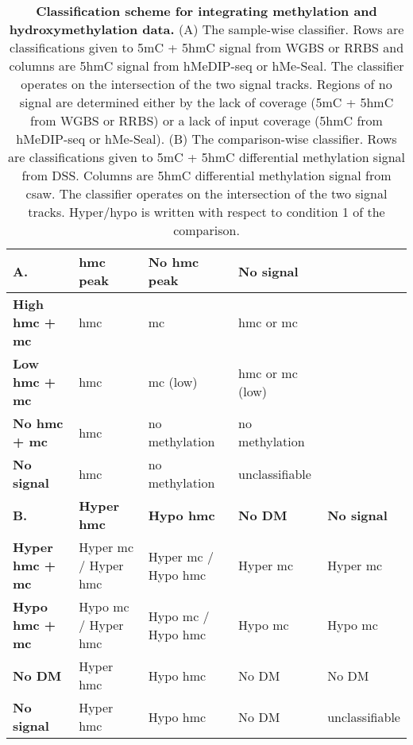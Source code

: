 \begin{sidewaystable}[!ht]
\small
\centering
\begin{tabular}{l|llll}
\textbf{A.}             & \textbf{hmc peak}    & \textbf{No hmc peak} & \textbf{No signal} &                    \\\hline
\textbf{High hmc + mc}  & hmc                  & mc                   & hmc or mc          &                    \\
\textbf{Low hmc + mc}   & hmc                  & mc (low)             & hmc or mc (low)    &                    \\
\textbf{No hmc + mc}    & hmc                  & no methylation       & no methylation     &                    \\
\textbf{No signal}      & hmc                  & no methylation       & unclassifiable     &                    \\\hline
\textbf{B.}             & \textbf{Hyper hmc}   & \textbf{Hypo hmc}    & \textbf{No DM}     & \textbf{No signal} \\\hline
\textbf{Hyper hmc + mc} & Hyper mc / Hyper hmc & Hyper mc / Hypo hmc  & Hyper mc           & Hyper mc           \\
\textbf{Hypo hmc + mc}  & Hypo mc / Hyper hmc  & Hypo mc / Hypo hmc   & Hypo mc            & Hypo mc            \\
\textbf{No DM}          & Hyper hmc            & Hypo hmc             & No DM              & No DM              \\
\textbf{No signal}      & Hyper hmc            & Hypo hmc             & No DM              & unclassifiable
\end{tabular}
\normalsize
\caption[Classification scheme for integrating methylation and hydroxymethylation data.]
{
\textbf{Classification scheme for integrating methylation and hydroxymethylation data.}
(A) The sample-wise classifier. Rows are classifications given to 5mC + 5hmC signal from WGBS or RRBS and columns are 5hmC signal from hMeDIP-seq or hMe-Seal. The classifier operates on the intersection of the two signal tracks. Regions of no signal are determined either by the lack of coverage (5mC + 5hmC from WGBS or RRBS) or a lack of input coverage (5hmC from hMeDIP-seq or hMe-Seal). (B) The comparison-wise classifier. Rows are classifications given to 5mC + 5hmC differential methylation signal from DSS. Columns are 5hmC differential methylation signal from csaw. The classifier operates on the intersection of the two signal tracks. Hyper/hypo is written with respect to condition 1 of the comparison.
}
\label{chap5:table:3}

\end{sidewaystable}
